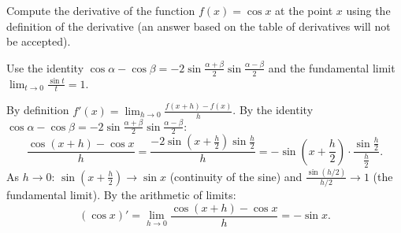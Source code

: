 
\begin{question}
Compute the derivative of the function $f(x)=\cos x$ at the point $x$ using the definition of the derivative (an answer based on the table of derivatives will not be accepted).
\end{question}

\begin{hint}
Use the identity $\cos\alpha-\cos\beta=-2\sin\frac{\alpha+\beta}{2}\sin\frac{\alpha-\beta}{2}$ and the fundamental limit $\lim_{t\to0}\frac{\sin t}{t}=1$.
\end{hint}

\begin{solution}
By definition $f'(x)=\lim_{h\to0}\frac{f(x+h)-f(x)}{h}$. By the identity $\cos\alpha-\cos\beta=-2\sin\frac{\alpha+\beta}{2}\sin\frac{\alpha-\beta}{2}$:
\[
\frac{\cos(x+h)-\cos x}{h}=\frac{-2\sin\left(x+\frac h2\right)\sin\frac h2}{h}=-\sin\left(x+\frac h2\right)\cdot\frac{\sin\frac h2}{\frac h2}.
\]
As $h\to0$: $\sin\left(x+\frac h2\right)\to\sin x$ (continuity of the sine) and $\frac{\sin(h/2)}{h/2}\to1$ (the fundamental limit). By the arithmetic of limits:
\[
(\cos x)'=\lim_{h\to0}\frac{\cos(x+h)-\cos x}{h}=-\sin x.
\]
\end{solution}
